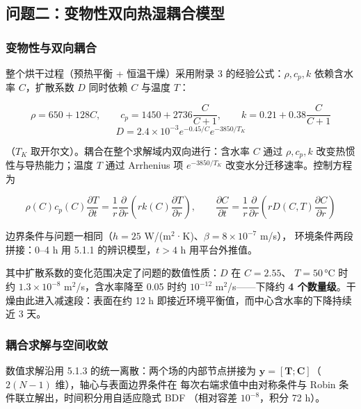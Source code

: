 \subsection{问题二：变物性双向热湿耦合模型}

\subsubsection{变物性与双向耦合}

整个烘干过程（预热平衡 + 恒温干燥）采用附录 3 的经验公式：$\rho,c_p,k$
依赖含水率 $C$，扩散系数 $D$ 同时依赖 $C$ 与温度 $T$：

\begin{equation}
\rho=650+128C,\qquad c_p=1450+2736\frac{C}{C+1},\qquad k=0.21+0.38\frac{C}{C+1}
\end{equation}
\begin{equation}
D=2.4\times10^{-3}e^{-0.45/C}e^{-3850/T_K}
\end{equation}

（$T_K$ 取开尔文）。耦合在整个求解域内双向进行：含水率 $C$ 通过
$\rho,c_p,k$ 改变热惯性与导热能力；温度 $T$ 通过 Arrhenius 项
$e^{-3850/T_K}$ 改变水分迁移速率。控制方程为

\begin{equation}
\rho(C)c_p(C)\frac{\partial T}{\partial t}=\frac{1}{r}\frac{\partial}{\partial r}\left(r k(C)\frac{\partial T}{\partial r}\right),\qquad
\frac{\partial C}{\partial t}=\frac{1}{r}\frac{\partial}{\partial r}\left(r D(C,T)\frac{\partial C}{\partial r}\right)
\end{equation}

边界条件与问题一相同（$h=25$ W/(m$^2$·K)、$\beta=8\times10^{-7}$ m/s），
环境条件两段拼接：0--4 h 用 5.1.1 的辨识模型，$t>4$ h 用平台外推值。

其中扩散系数的变化范围决定了问题的数值性质：$D$ 在 $C=2.55$、
$T=50$\,°C 时约 $1.3\times10^{-8}$ m$^2$/s，含水率降至 0.05 时约
$10^{-12}$ m$^2$/s——下降约 \textbf{4 个数量级}。干燥由此进入减速段：表面在约
12 h 即接近环境平衡值，而中心含水率的下降持续近 3 天。

\subsubsection{耦合求解与空间收敛}

数值求解沿用 5.1.3 的统一离散：两个场的内部节点拼接为
$\mathbf{y}=[\mathbf{T};\mathbf{C}]$（$2(N-1)$ 维），轴心与表面边界条件在
每次右端求值中由对称条件与 Robin 条件联立解出，时间积分用自适应隐式 BDF
（相对容差 $10^{-8}$，积分 72 h）。

